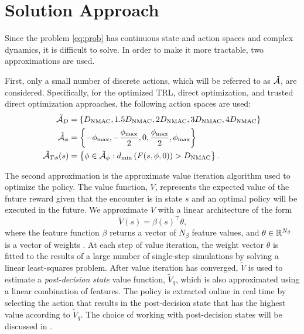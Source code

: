 \section{Solution Approach} \label{sec:approach}

Since the problem \eqref{eq:prob} has continuous state and action spaces and complex dynamics, it is difficult to solve.
In order to make it more tractable, two approximations are used.

First, only a small number of discrete actions, which will be referred to as $\tilde{\mathcal{A}}$, are considered. Specifically, for the optimized TRL, direct optimization, and trusted direct optimization approaches, the following action spaces are used:
\begin{align}
    {\tilde{\ensuremath{\mathcal{A}}}}_{D} &= \{D_\mathrm{NMAC}, \allowbreak 1.5 D_\mathrm{NMAC}, \allowbreak 2 D_\mathrm{NMAC}, \allowbreak 3 D_\mathrm{NMAC}, \allowbreak 4 D_\mathrm{NMAC} \} \\
    {\tilde{\mathcal{A}}}_\phi &= \left\{-\phi_\text{max},-\frac{\phi_\text{max}}{2}, 0, \frac{\phi_\text{max}}{2},\phi_\text{max}\right\} \\
    {\tilde{\mathcal{A}}}_{T\phi}(s) &= \left\{\phi \in {\tilde{\ensuremath{\mathcal{A}}}}_\phi : d_\text{min}\left(F(s, \phi, 0)\right) > D_\text{NMAC} \right\} \text{.}
\end{align}

The second approximation is the approximate value iteration algorithm \cite{DB:05} used to optimize the policy. The value function, $V$, represents the expected value of the future reward given that the encounter is in state $s$ and an optimal policy will be executed in the future. We approximate $V$ with a linear architecture of the form  \cite{DB:05}
\begin{equation}\label{eqn:val}
    \tilde{V}(s) = \beta(s)^\top \theta \text{,}
\end{equation}
where the feature function $\beta$ returns a vector of $N_\beta$ feature values, and $\theta\in \mathbb{R}^{N_\beta}$ is a vector of weights \cite{DB:05}. At each step of  value iteration, the weight vector $\theta$ is fitted to the results of a large number of single-step simulations by solving a linear least-squares problem. After value iteration has converged, $\tilde{V}$ is used to estimate a \emph{post-decision state} value function, $\tilde{V}_q$,  which is also approximated using a linear combination of features. The policy is extracted online in real time by selecting the action that results in the post-decision state that has the highest value according to $\tilde{V}_q$. The choice of working with post-decision states will be discussed in .

